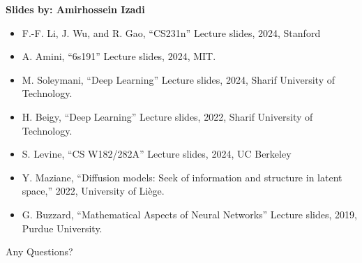 \documentclass[serif, aspectratio=169]{beamer}
\begin{document}
\begin{frame}[allowframebreaks]
    
    
    \nocite{*} %
    \small
    \textbf{Slides by: Amirhossein Izadi}
    \begin{itemize}
        \item F.-F. Li, J. Wu, and R. Gao, “CS231n” Lecture slides, 2024, Stanford 
        \item A. Amini, “6s191” Lecture slides, 2024, MIT. 
        \item M. Soleymani, “Deep Learning” Lecture slides, 2024, Sharif University of Technology.
        \item H. Beigy, “Deep Learning” Lecture slides, 2022, Sharif University of Technology.
        \item S. Levine, “CS W182/282A” Lecture slides, 2024, UC Berkeley 
        \item Y. Maziane, “Diffusion models: Seek of information and structure in latent space,” 2022, University of Liège.
        \item G. Buzzard, “Mathematical Aspects of Neural Networks” Lecture slides, 2019, Purdue University.
    \end{itemize}
\end{frame}


\begin{frame}
    \begin{center}
        {\Huge Any Questions?}
    \end{center}
\end{frame}
\end{document}
